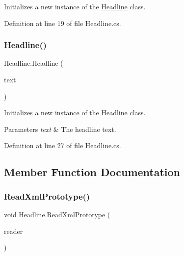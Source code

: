 Initializes a new instance of the \hyperlink{class_headline}{Headline} class. 



Definition at line 19 of file Headline.\+cs.

\mbox{\label{class_headline_aeec63fed5d171793aecf336bb8b0896d}} 
\subsubsection{\texorpdfstring{Headline()}{Headline()}\hspace{0.1cm}{\footnotesize\ttfamily [2/2]}}
{\footnotesize\ttfamily Headline.\+Headline (\begin{DoxyParamCaption}\item[{string}]{text }\end{DoxyParamCaption})}



Initializes a new instance of the \hyperlink{class_headline}{Headline} class. 


\begin{DoxyParams}{Parameters}
{\em text} & The headline text.\\
\hline
\end{DoxyParams}


Definition at line 27 of file Headline.\+cs.



\subsection{Member Function Documentation}
\mbox{\label{class_headline_a528e76fd6eab76aa10ef322ffe20bd1a}} 
\subsubsection{\texorpdfstring{Read\+Xml\+Prototype()}{ReadXmlPrototype()}}
{\footnotesize\ttfamily void Headline.\+Read\+Xml\+Prototype (\begin{DoxyParamCaption}\item[{Xml\+Reader}]{reader }\end{DoxyParamCaption})}



